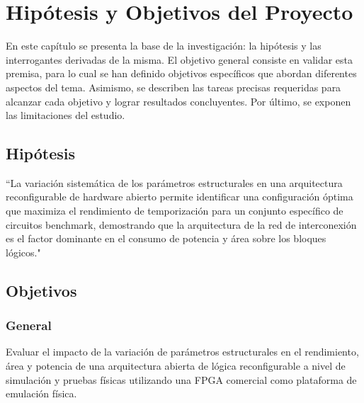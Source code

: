\chapter{Hipótesis y Objetivos del Proyecto}
\label{ch:HyO}

En este capítulo se presenta la base de la investigación: la hipótesis y las 
interrogantes derivadas de la misma. El objetivo general consiste en validar 
esta premisa, para lo cual se han definido objetivos específicos que abordan 
diferentes aspectos del tema. Asimismo, se describen las tareas precisas 
requeridas para alcanzar cada objetivo y lograr resultados concluyentes. Por 
último, se exponen las limitaciones del estudio.

\section{Hipótesis}
     ``La variación sistemática de los parámetros estructurales en una arquitectura 
     reconfigurable de hardware abierto permite identificar una configuración 
     óptima que maximiza el rendimiento de temporización para un conjunto específico 
     de circuitos benchmark, demostrando que la arquitectura de la red de 
     interconexión es el factor dominante en el consumo de potencia y área 
     sobre los bloques lógicos."
\section{Objetivos}

\subsection{General}
            Evaluar el impacto de la variación de parámetros estructurales en el 
            rendimiento, área y potencia de una arquitectura abierta de lógica 
            reconfigurable a nivel de simulación y pruebas físicas utilizando una 
            FPGA comercial como plataforma de emulación física.
